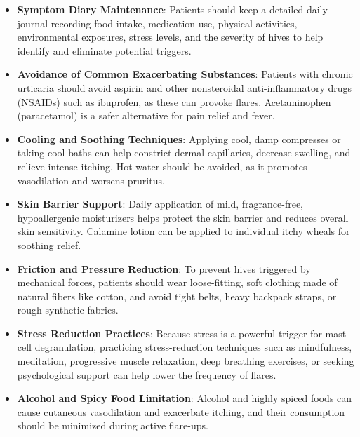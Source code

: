 \begin{itemize}
    \item \textbf{Symptom Diary Maintenance}: Patients should keep a detailed daily journal recording food intake, medication use, physical activities, environmental exposures, stress levels, and the severity of hives to help identify and eliminate potential triggers.
    \item \textbf{Avoidance of Common Exacerbating Substances}: Patients with chronic urticaria should avoid aspirin and other nonsteroidal anti-inflammatory drugs (NSAIDs) such as ibuprofen, as these can provoke flares. Acetaminophen (paracetamol) is a safer alternative for pain relief and fever.
    \item \textbf{Cooling and Soothing Techniques}: Applying cool, damp compresses or taking cool baths can help constrict dermal capillaries, decrease swelling, and relieve intense itching. Hot water should be avoided, as it promotes vasodilation and worsens pruritus.
    \item \textbf{Skin Barrier Support}: Daily application of mild, fragrance-free, hypoallergenic moisturizers helps protect the skin barrier and reduces overall skin sensitivity. Calamine lotion can be applied to individual itchy wheals for soothing relief.
    \item \textbf{Friction and Pressure Reduction}: To prevent hives triggered by mechanical forces, patients should wear loose-fitting, soft clothing made of natural fibers like cotton, and avoid tight belts, heavy backpack straps, or rough synthetic fabrics.
    \item \textbf{Stress Reduction Practices}: Because stress is a powerful trigger for mast cell degranulation, practicing stress-reduction techniques such as mindfulness, meditation, progressive muscle relaxation, deep breathing exercises, or seeking psychological support can help lower the frequency of flares.
    \item \textbf{Alcohol and Spicy Food Limitation}: Alcohol and highly spiced foods can cause cutaneous vasodilation and exacerbate itching, and their consumption should be minimized during active flare-ups.
\end{itemize}

